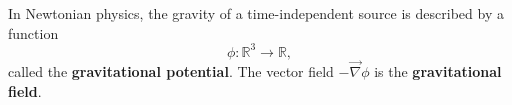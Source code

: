 In Newtonian physics, the gravity of a time-independent source is described by a function
$$\phi: \mathbb{R}^3 \to \mathbb{R},$$
called the \textbf{gravitational potential}. The vector field $-\vec{\nabla}\phi$ is the \textbf{gravitational field}.
